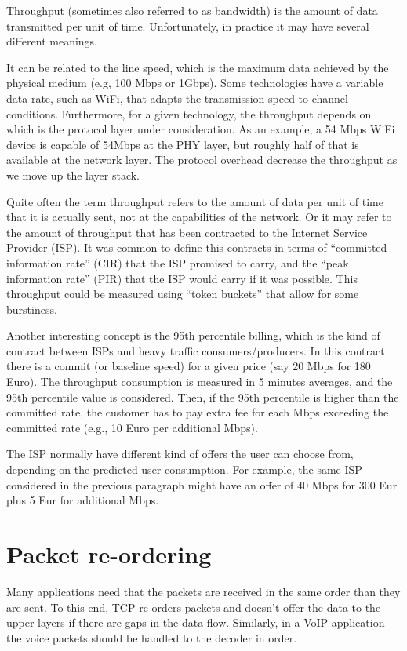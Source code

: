 Throughput (sometimes also referred to as bandwidth) is the amount of data transmitted per unit of time.
Unfortunately, in practice it may have several different meanings.

It can be related to the line speed, which is the maximum data achieved by the physical medium (e.g, 100 Mbps or 1Gbps).
Some technologies have a variable data rate, such as WiFi, that adapts the transmission speed to channel conditions.
Furthermore, for a given technology, the throughput depends on which is the protocol layer under consideration.
As an example, a 54 Mbps WiFi device is capable of 54Mbps at the PHY layer, but roughly half of that is available at the network layer.
The protocol overhead decrease the throughput as we move up the layer stack.

Quite often the term throughput refers to the amount of data per unit of time that it is actually sent, not at the capabilities of the network.
Or it may refer to the amount of throughput that has been contracted to the Internet Service Provider (ISP).
It was common to define this contracts in terms of ``committed information rate'' (CIR) that the ISP promised to carry, and the ``peak information rate'' (PIR) that the ISP would carry if it was possible.
This throughput could be measured using ``token buckets'' that allow for some burstiness. 

Another interesting concept is the 95th percentile billing, which is the kind of contract between ISPs and heavy traffic consumers/producers.
In this contract there is a commit (or baseline speed) for a given price (say 20 Mbps for 180 Euro).
The throughput consumption is measured in 5 minutes averages, and the 95th percentile value is considered.
Then, if the 95th percentile is higher than the committed rate, the customer has to pay extra fee for each Mbps exceeding the committed rate (e.g., 10 Euro per additional Mbps).

The ISP normally have different kind of offers the user can choose from, depending on the predicted user consumption.
For example, the same ISP considered in the previous paragraph might have an offer of 40 Mbps for 300 Eur plus 5 Eur for additional Mbps.
\section{Packet re-ordering}

Many applications need that the packets are received in the same order than they are sent.
To this end, TCP re-orders packets and doesn't offer the data to the upper layers if there are gaps in the data flow.
Similarly, in a VoIP application the voice packets should be handled to the decoder in order.

